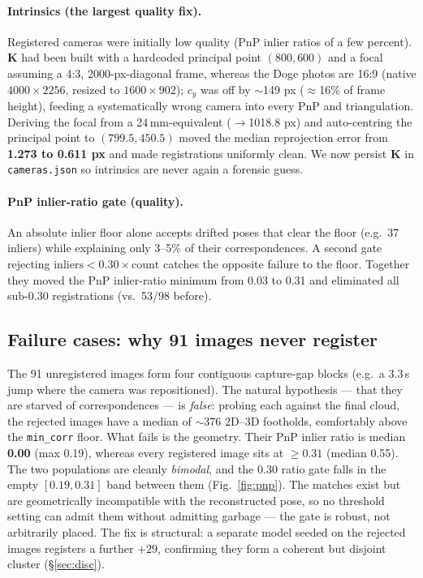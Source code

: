 \documentclass{article} %
\begin{document}
\paragraph{Intrinsics (the largest quality fix).} Registered cameras were
initially low quality (PnP inlier ratios of a few percent). $\mathbf{K}$ had been
built with a hardcoded principal point $(800,600)$ and a focal assuming a
4:3, 2000-px-diagonal frame, whereas the Doge photos are 16:9 (native
$4000\times2256$, resized to $1600\times902$); $c_y$ was off by $\sim$149 px
($\approx$16\% of frame height), feeding a systematically wrong camera into every
PnP and triangulation. Deriving the focal from a 24\,mm-equivalent ($\to$1018.8
px) and auto-centring the principal point to $(799.5, 450.5)$ moved the median
reprojection error from \textbf{1.273 to 0.611 px} and made registrations
uniformly clean. We now persist $\mathbf{K}$ in \texttt{cameras.json} so
intrinsics are never again a forensic guess.

\paragraph{PnP inlier-ratio gate (quality).} An absolute inlier floor alone
accepts drifted poses that clear the floor (e.g.\ 37 inliers) while explaining
only 3--5\% of their correspondences. A second gate rejecting
$\text{inliers} < 0.30 \times \text{count}$ catches the opposite failure to the
floor. Together they moved the PnP inlier-ratio minimum from 0.03 to 0.31 and
eliminated all sub-0.30 registrations (vs.\ 53/98 before).

\subsection{Failure cases: why 91 images never register}
The 91 unregistered images form four contiguous capture-gap blocks (e.g.\ a
3.3\,s jump where the camera was repositioned). The natural hypothesis --- that
they are starved of correspondences --- is \emph{false}: probing each against the
final cloud, the rejected images have a median of $\sim$376 2D--3D footholds,
comfortably above the \texttt{min\_corr} floor. What fails is the geometry. Their
PnP inlier ratio is median \textbf{0.00} (max 0.19), whereas every registered image
sits at \textbf{$\ge 0.31$} (median 0.55). The two populations are cleanly
\emph{bimodal}, and the $0.30$ ratio gate falls in the empty $[0.19, 0.31]$ band
between them (Fig.~\ref{fig:pnp}). The matches exist but are geometrically
incompatible with the reconstructed pose, so no threshold setting can admit them
without admitting garbage --- the gate is robust, not arbitrarily placed. The fix
is structural: a separate model seeded on the rejected images registers a further
$+29$, confirming they form a coherent but disjoint cluster (§\ref{sec:disc}).
\end{document}
